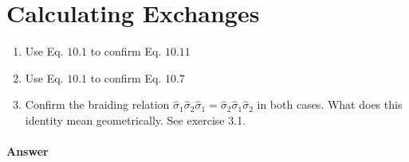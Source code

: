 
\section{Calculating Exchanges}

\begin{enumerate}
\item Use Eq. $10.1$ to confirm Eq. $10.11$
\item Use Eq. $10.1$ to confirm Eq. $10.7$
\item Confirm the braiding relation $\hat{\sigma }_{1}\hat{\sigma }_{2}\hat{\sigma }_{1} =\hat{\sigma }_{2}\hat{\sigma }_{1}\hat{\sigma }_{2}$ in both cases. What does this identity mean geometrically. See exercise 3.1.
\end{enumerate}

\paragraph{Answer}

